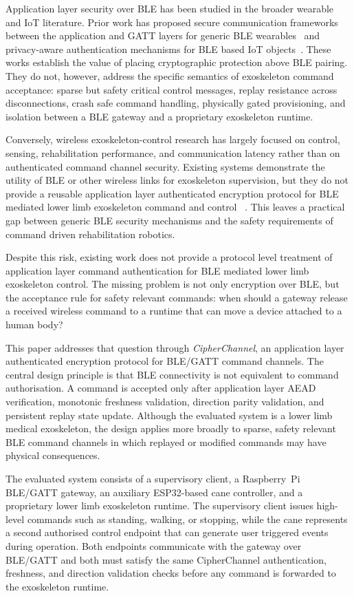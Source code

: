\documentclass[journal]{IEEEtran}
\begin{document}
Application layer security over BLE has been studied in the broader wearable and IoT literature. Prior work has proposed secure communication frameworks between the application and GATT layers for generic BLE wearables~\cite{zhang2019bleframework} and privacy-aware authentication mechanisms for BLE based IoT objects~\cite{cha2017bleiot}. These works establish the value of placing cryptographic protection above BLE pairing. They do not, however, address the specific semantics of exoskeleton command acceptance: sparse but safety critical control messages, replay resistance across disconnections, crash safe command handling, physically gated provisioning, and isolation between a BLE gateway and a proprietary exoskeleton runtime.

Conversely, wireless exoskeleton-control research has largely focused on control, sensing, rehabilitation performance, and communication latency rather than on authenticated command channel security. Existing systems demonstrate the utility of BLE or other wireless links for exoskeleton supervision, but they do not provide a reusable application layer authenticated encryption protocol for BLE mediated lower limb exoskeleton command and control
~\cite{andersson2024wireless,vinoj2019bclle,ozhiken2025ankle,wilhelm2022finger}. This leaves a practical gap between generic BLE security mechanisms and the safety requirements of command driven rehabilitation robotics.

Despite this risk, existing work does not provide a protocol level treatment of application layer command authentication for BLE mediated lower limb exoskeleton control. The missing problem is not only encryption over BLE, but the acceptance rule for safety relevant commands: when should a gateway release a received wireless command to a runtime that can move a device attached to a human body?

This paper addresses that question through \emph{CipherChannel}, an application layer authenticated encryption protocol for BLE/GATT command channels. The central design principle is that BLE connectivity is not equivalent to command authorisation. A command is accepted only after application layer AEAD verification, monotonic freshness validation, direction parity validation, and persistent replay state update. Although the evaluated system is a lower limb medical exoskeleton, the design applies more broadly to sparse, safety relevant BLE command channels in which replayed or modified commands may have physical consequences.

The evaluated system consists of a supervisory client, a Raspberry~Pi BLE/GATT gateway, an auxiliary ESP32-based cane controller, and a proprietary lower limb exoskeleton runtime. The supervisory client issues high-level commands such as standing, walking, or stopping, while the cane represents a second authorised control endpoint that can generate user triggered events during operation. Both endpoints communicate with the gateway over BLE/GATT and both must satisfy the same CipherChannel authentication, freshness, and direction validation checks before any command is forwarded to the exoskeleton runtime.
\end{document}
